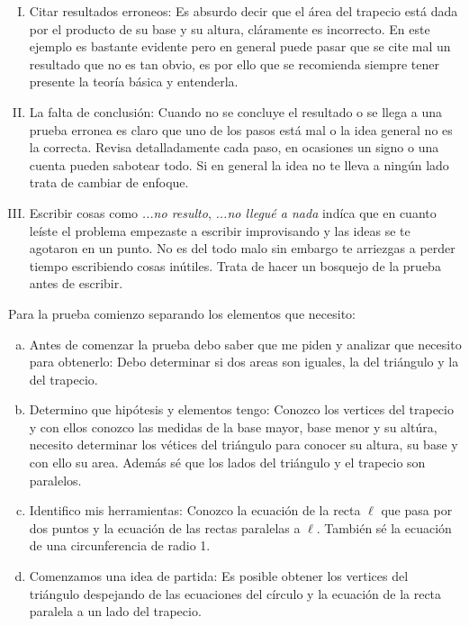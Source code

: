 \documentclass[a4paper,openright,10pt]{book}
\numberwithin{equation}{section}
\theoremstyle{definition}
\theoremstyle{definition}
\begin{document}
\begin{itemize}
\begin{enumerate}[I)]
\item Citar resultados erroneos: Es absurdo decir que el área del trapecio está dada por el producto de su base y su altura, cláramente es incorrecto. En este ejemplo es bastante evidente pero en general puede pasar que se cite mal un resultado que no es tan obvio, es por ello que se recomienda siempre tener presente la teoría básica y entenderla.

\item La falta de conclusión: Cuando no se concluye el resultado o se llega a una prueba erronea es claro que uno de los pasos está mal o la idea general no es la correcta. Revisa detalladamente cada paso, en ocasiones un signo o una cuenta pueden sabotear todo. Si en general la idea no te lleva a ningún lado trata de cambiar de enfoque.

\item Escribir cosas como \textit{...no resulto}, \textit{...no llegué a nada} indíca que en cuanto leíste el problema empezaste a escribir improvisando y las ideas se te agotaron en un punto. No es del todo malo sin embargo te arriezgas a perder tiempo escribiendo cosas inútiles. Trata de hacer un bosquejo de la prueba antes de escribir. 

\end{enumerate}
Para la prueba comienzo separando los elementos que necesito:

\begin{enumerate}[a)]
\item Antes de comenzar la prueba debo saber que me piden y analizar que necesito para obtenerlo: Debo determinar si dos areas son iguales, la del triángulo y la del trapecio. \\

\item Determino que hipótesis y elementos tengo: Conozco los vertices del trapecio y con ellos conozco las medidas de la base mayor, base menor y su altúra, necesito determinar los vétices del triángulo para conocer su altura, su base y con ello su area. Además sé que los lados del triángulo y el trapecio son paralelos.

\item Identifico mis herramientas: Conozco la ecuación de la recta $\ell$ que pasa por dos puntos y la ecuación de las rectas paralelas a $\ell.$ También sé la ecuación de una circunferencia de radio 1.  

\item Comenzamos una idea de partida: Es posible obtener los vertices del triángulo despejando de las ecuaciones del círculo y la ecuación de la recta paralela a un lado del trapecio. 


\end{enumerate}
\end{itemize}
\end{document}
